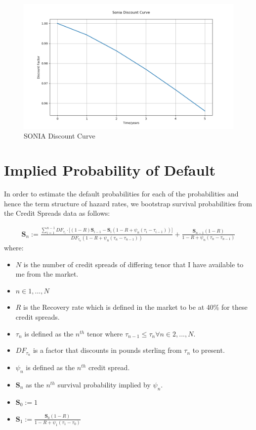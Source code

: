\documentclass{report}
\theoremstyle{plain}
\theoremstyle{definition}
\begin{document}
\begin{figure}[H]
	\begin{center}
		\includegraphics[width=15cm]{Sonia_Discount_Curve.png}
		\caption{SONIA Discount Curve} 
		\label{Sonia_Discount_Curve}
	\end{center}
\end{figure}

\chapter{Implied Probability of Default}
In order to estimate the default probabilities for each of the probabilities and hence the term structure of hazard rates, we bootstrap survival probabilities from the Credit Spreads data as follows:

\begin{align*}
\mathbf{S}_n := \frac{\sum_{i=1}^{n-1}DF_{\tau_i} \cdot \Big[ (1-R)\mathbf{S}_{i-1} - \mathbf{S}_{i}(1 - R + \psi_n(\tau_i - \tau_{i-1}))  \Big]  }{ DF_{\tau_n} (1 - R + \psi_n(\tau_n - \tau_{n-1})) } + \frac{\mathbf{S}_{n-1}(1-R)}{1 - R + \psi_n(\tau_n - \tau_{n-1})}
\end{align*}
where:
\begin{itemize}
	\item $N$ is the number of credit spreads of differing tenor that I have available to me from the market.
	\item $n \in {1,...,N}$ 
	\item $R$ is the Recovery rate which is defined in the market to be at 40\% for these credit spreads.
	\item $\tau_n$ is defined as the $n^{th}$ tenor where $\tau_{n-1} \le \tau_{n} \forall n \in {2,...,N}$.
	\item $DF_{\tau_n}$ is a factor that discounts in pounds sterling from $\tau_n$ to present.
	\item $\psi_n$ is defined as the $n^{th}$ credit spread.
	\item $\mathbf{S}_n$ as the $n^{th}$ survival probability implied by $\psi_n$.
	\item $\mathbf{S}_0 := 1$ 
	\item $\mathbf{S}_1 := \frac{\mathbf{S}_{0}(1-R)}{1 - R + \psi_1(\tau_1 - \tau_{0})}$ 
\end{itemize}
\end{document}
